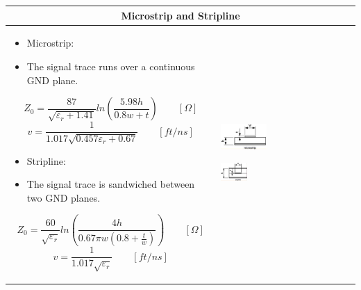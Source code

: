 		
		\begin{table}[h!]
		\centering
		\begin{tabular}{|m{}|m{}|}
				\multicolumn{2}{c}{\textbf{Microstrip and Stripline}}
			\\
			\hline
				\begin{itemize}
					\setlength{\itemsep}{-4pt}
					\item Microstrip: 
					\item[] The signal trace runs over a continuous GND plane. 
				\end{itemize}
				\begin{equation}
					Z_0 = \frac{87}{\sqrt{\varepsilon_r + 1.41}} ln\left(\frac{5.98h}{0.8w + t}\right) \qquad [\Omega]		
				\end{equation}
				\begin{equation}
					v = \frac{1}{1.017\sqrt{0.457 \varepsilon_r + 0.67}} \qquad[ft/ns]	
				\end{equation}
				\begin{itemize}
					\setlength{\itemsep}{-4pt}
					\item Stripline: 
					\item[]The signal trace is sandwiched between two GND planes. 
				\end{itemize}
			\begin{equation}
					Z_0 = \frac{60}{\sqrt{\varepsilon_r}} ln\left(\frac{4h}{0.67\pi w \left(0.8 + \frac{t}{w}\right)}\right) \qquad[\Omega]		
				\end{equation}
				\begin{equation}
					v = \frac{1}{1.017\sqrt{\varepsilon_r}} \qquad[ft/ns]	
				\end{equation}
			&
					\begin{center}\includegraphics[width=0.35\textwidth]{images/Microstrip.png}\end{center} 
					\begin{center}\includegraphics[width=0.2\textwidth]{images/Stripline.png}\end{center} 
 
			\\
			\hline
			\end{tabular}
		\end{table}